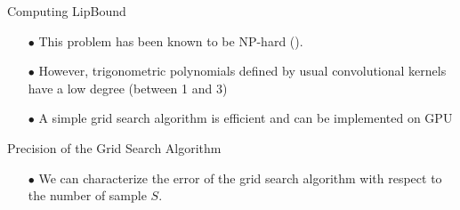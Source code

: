 \begin{frame}{Computing LipBound}
  \begin{itemize}
    \pause
  \item[$\bullet$] This problem has been known to be NP-hard ({}).
    \pause
    \item[$\bullet$] However, trigonometric polynomials defined by usual convolutional kernels have a low degree (between 1 and 3)
    \pause
    \item[$\bullet$] A simple grid search algorithm is efficient and can be implemented on GPU
  \end{itemize}

\end{frame}


\begin{frame}{Precision of the Grid Search Algorithm}


  \begin{itemize}
    \item[$\bullet$] We can characterize the error of the grid search algorithm with respect to the number of sample $S$.
  \end{itemize}


\end{frame}
